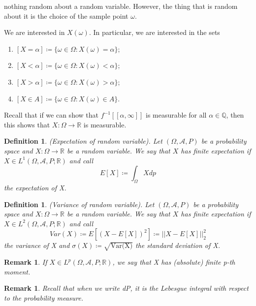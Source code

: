 \documentclass[twoside]{article}
\newtheorem{remark}[theorem]{Remark}
\newtheorem{definition}[theorem]{Definition}
\begin{document}
nothing random about a random variable. However, the thing that is random about it is the choice of the sample point $\omega$. 

We are interested in $X(\omega)$. In particular, we are interested in the sets
\begin{enumerate}
    \item $[X = \alpha] \coloneqq \{\omega \in \Omega: X(\omega) = \alpha\}$;
    \item $[X < \alpha] \coloneqq \{\omega \in \Omega: X(\omega) < \alpha\}$;
    \item $[X > \alpha] \coloneqq \{\omega \in \Omega: X(\omega) > \alpha\}$;
    \item $[X \in A] \coloneqq \{\omega \in \Omega: X(\omega) \in A\}$. 
\end{enumerate}

Recall that if we can show that $f^{-1}[[\alpha, \infty]]$ is measurable for all $\alpha \in \mathbb{Q}$, then this shows that $X: \Omega \rightarrow \mathbb{R}$ is measurable.

\begin{definition}(Expectation of random variable). Let $(\Omega, \mathcal{A}, P)$ be a probability space and $X: \Omega \rightarrow \mathbb{R}$ be a random variable. We say that $X$ has finite expectation if $X \in L^1(\Omega, \mathcal{A}, P; \mathbb{R})$ and call
$$
E[X] \coloneqq \int_{\Omega}Xdp
$$
the expectation of X.
\end{definition}

\begin{definition}(Variance of random variable). Let $(\Omega, \mathcal{A}, P)$ be a probability space and $X: \Omega \rightarrow \mathbb{R}$ be a random variable. We say that $X$ has finite expectation if $X \in L^2(\Omega, \mathcal{A}, P; \mathbb{R})$ and call
$$
Var(X) \coloneqq E[(X - E[X])^2] \coloneqq ||X - E[X]||_2^2
$$
the variance of X and $\sigma(X) \coloneqq \sqrt{\text{Var(X)}}$ the standard deviation of X.
\end{definition}

\begin{remark} If $X \in L^p(\Omega,\mathcal{A},P;\mathbb{R})$, we say that X has (absolute) finite p-th moment.
\end{remark}

\begin{remark} Recall that when we write dP, it is the Lebesgue integral with respect to the probability measure.
\end{remark}
\end{document}

